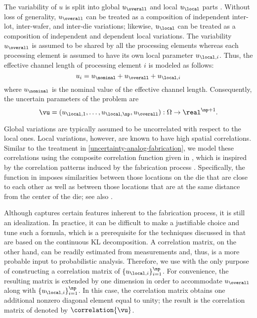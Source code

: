 The variability of $u$ is split into global $u_\overall$ and local $u_\local$
parts \cite{shen2009, chandra2010}. Without loss of generality, $u_\overall$ can
be treated as a composition of independent inter-lot, inter-wafer, and inter-die
variations; likewise, $u_\local$ can be treated as a composition of independent
and dependent local variations. The variability $u_\overall$ is assumed to be
shared by all the \np processing elements whereas each processing element is
assumed to have its own local parameter $u_{\local, i}$. Thus, the effective
channel length of processing element $i$ is modeled as follows:
\[
  u_i = u_\nominal + u_\overall + u_{\local, i}
\]
where $u_\nominal$ is the nominal value of the effective channel length.
Consequently, the uncertain parameters of the problem are
\[
  \vu = (u_{\local, 1}, \dotsc, u_{\local, \np}, u_\overall): \Omega \to \real^{\np + 1}.
\]

Global variations are typically assumed to be uncorrelated with respect to the
local ones. Local variations, however, are known to have high spatial
correlations. Similar to the treatment in \cref{uncertainty-analog-fabrication},
we model these correlations using the composite correlation function given in
, which is inspired by the correlation patterns
induced by the fabrication process \cite{friedberg2005, chandrakasan2000,
cheng2011}. Specifically, the function in  imposes
similarities between those locations on the die that are close to each other as
well as between those locations that are at the same distance from the center of
the die; see also \cite{ghanem1991, ghanta2006, bhardwaj2008, huang2009a,
lee2013}.

Although  captures certain features inherent to the
fabrication process, it is still an idealization. In practice, it can be
difficult to make a justifiable choice and tune such a formula, which is a
prerequisite for the techniques discussed in  that are based
on the continuous \ac{KL} decomposition. A correlation matrix, on the other
hand, can be readily estimated from measurements and, thus, is a more probable
input to probabilistic analysis. Therefore, we use 
with the only purpose of constructing a correlation matrix of $\{ u_{\local, i}
\}_{i = 1}^\np$. For convenience, the resulting matrix is extended by one
dimension in order to accommodate $u_\overall$ along with $\{ u_{\local, i}
\}_{i = 1}^\np$. In this case, the correlation matrix obtains one additional
nonzero diagonal element equal to unity; the result is the correlation matrix of
\vu denoted by $\correlation{\vu}$.

